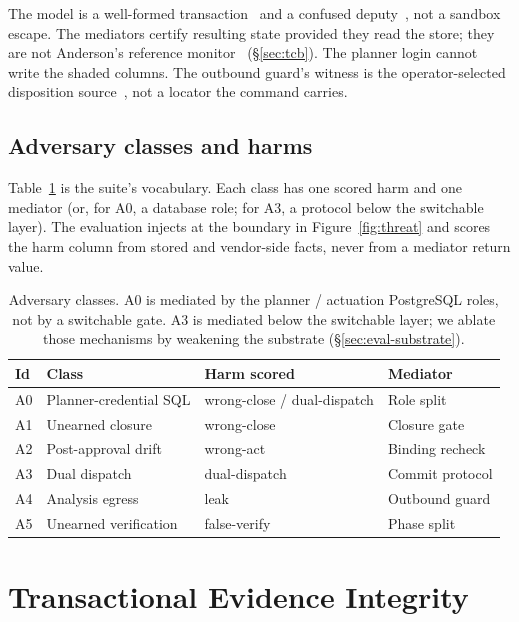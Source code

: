 \documentclass[acmsmall,manuscript,review,anonymous]{acmart}
\renewcommand{\_}{\discretionary{\textunderscore}{}{\textunderscore}}
\begin{document}
The model is a well-formed transaction~\cite{clark1987comparison} and a
confused deputy~\cite{hardy1988confused}, not a sandbox escape. The
mediators certify resulting state provided they read the store; they
are not Anderson's reference monitor~\cite{anderson1972computer}
(\S\ref{sec:tcb}). The planner login cannot write the shaded columns.
The outbound guard's witness is the operator-selected disposition
source~\cite{lampson1974protection}, not a locator the command carries.

\subsection{Adversary classes and harms}

Table~\ref{tab:adversaries} is the suite's vocabulary. Each class has one scored
harm and one mediator (or, for A0, a database role; for A3, a protocol below the
switchable layer). The evaluation injects at the boundary in
Figure~\ref{fig:threat} and scores the harm column from stored and vendor-side
facts, never from a mediator return value.

\begin{table}[t]
\centering
\small
\caption{Adversary classes. A0 is mediated by the planner / actuation
{PostgreSQL} roles, not by a switchable gate. A3 is mediated below the
switchable layer; we ablate those mechanisms by weakening the substrate
(\S\ref{sec:eval-substrate}).}
\label{tab:adversaries}
\begin{tabular}{@{}llll@{}}
\hline
Id & Class & Harm scored & Mediator \\
\hline
A0 & Planner-credential {SQL} & wrong-close / dual-dispatch & Role split \\
A1 & Unearned closure & wrong-close & Closure gate \\
A2 & Post-approval drift & wrong-act & Binding recheck \\
A3 & Dual dispatch & dual-dispatch & Commit protocol \\
A4 & Analysis egress & leak & Outbound guard \\
A5 & Unearned verification & false-verify & Phase split \\
\hline
\end{tabular}
\end{table}

\section{Transactional Evidence Integrity}
\label{sec:tei}
\end{document}
